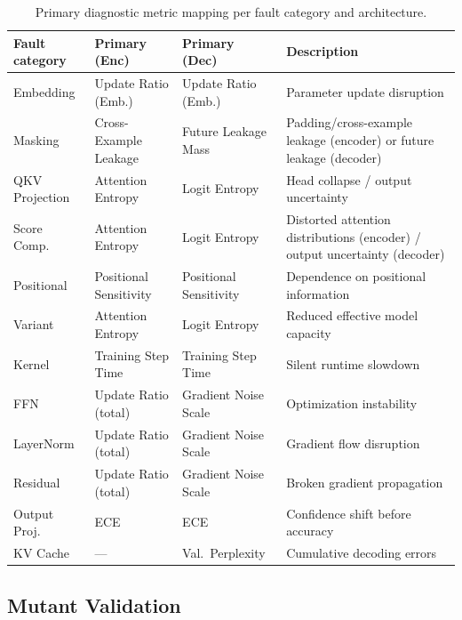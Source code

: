 \begin{table}[!htbp]
\caption{Primary diagnostic metric mapping per fault category and architecture.}
\label{tab:metric-mapping}
\centering
\footnotesize
\renewcommand{\arraystretch}{1.0}
\setlength{\tabcolsep}{4pt}
\begin{tabular}{@{} l l l >{\raggedright\arraybackslash}p{5.0cm} @{}}
\toprule
\textbf{Fault category} & \textbf{Primary (Enc)} & \textbf{Primary (Dec)} & \textbf{Description} \\
\midrule
Embedding      & Update Ratio (Emb.)    & Update Ratio (Emb.)    & Parameter update disruption \\
Masking        & Cross-Example Leakage  & Future Leakage Mass             & Padding/cross-example leakage (encoder) or future leakage (decoder) \\
QKV Projection & Attention Entropy     & Logit Entropy          & Head collapse / output uncertainty \\
Score Comp.    & Attention Entropy     & Logit Entropy          & Distorted attention distributions (encoder) / output uncertainty (decoder) \\
Positional     & Positional Sensitivity & Positional Sensitivity & Dependence on positional information \\
Variant        & Attention Entropy     & Logit Entropy          & Reduced effective model capacity \\
Kernel         & Training Step Time    & Training Step Time     & Silent runtime slowdown \\
FFN            & Update Ratio (total)  & Gradient Noise Scale   & Optimization instability \\
LayerNorm      & Update Ratio (total)  & Gradient Noise Scale   & Gradient flow disruption \\
Residual       & Update Ratio (total)  & Gradient Noise Scale   & Broken gradient propagation \\
Output Proj.   & ECE                   & ECE                    & Confidence shift before accuracy \\
KV Cache       & ---                   & Val.\ Perplexity       & Cumulative decoding errors \\
\bottomrule
\end{tabular}
\end{table}


\subsection{Mutant Validation}
\label{subsec:validation}

